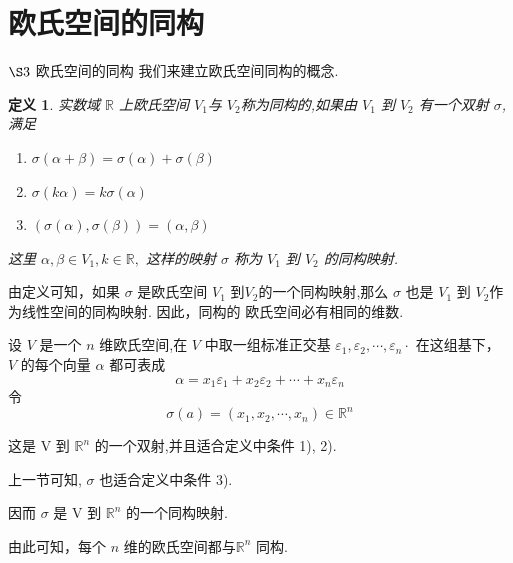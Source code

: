 \documentclass[13pt]{beamer}
\newtheorem*{defi}{定义}
\def\R{\mathbb{R}}
\begin{document}
\section{欧氏空间的同构}
\begin{frame}{$\S 3$ 欧氏空间的同构}
我们来建立欧氏空间同构的概念.  

\begin{defi}
 实数域 $\mathbb{R}$ 上欧氏空间 $V_1$与 $V_2$称为\alert{同构}的,如果由 $V_1$ 到 $V_2$ 有一个双射 $\sigma$,满足
\begin{enumerate}
	\item $\sigma({\alpha}+{\beta})=\sigma({\alpha})+\sigma({\beta})$
	\item $\sigma(k {\alpha})=k \sigma({\alpha})$
	\item $(\sigma({\alpha}), \sigma({\beta}))=({\alpha}, {\beta})$
\end{enumerate}
这里 ${\alpha}, {\beta} \in V_1, k \in {\R},$ 这样的映射 $\sigma$ 称为 $V_1$ 到 $V_2$ 的同构映射. 
\end{defi}
由定义可知，如果 $\sigma$ 是欧氏空间 $V_1$ 到$V_2$的一个同构映射,那么 $\sigma$ 也是 $V_1$ 到 $V_2$作为线性空间的同构映射.
因此，同构的 欧氏空间必有相同的维数.
\end{frame}



\begin{frame}
设 $V$ 是一个 $n$ 维欧氏空间,在 $V$ 中取一组标准正交基 ${\varepsilon}_{1}, {\varepsilon}_{2}, \cdots, {\varepsilon}_{n} \cdot$ 在这组基下， $V$ 的每个向量 ${\alpha}$ 都可表成
\[
{\alpha}= {x}_{1} {\varepsilon}_{1}+x_{2} {{\varepsilon}}_{2}+\cdots+x_{n} {\varepsilon}_{n}
\]
令
\[
\sigma({a})=\left(x_{1}, x_{2}, \cdots, x_{n}\right) \in \mathbb{R}^n
\]

这是 V 到 $\mathbb{R}^n$ 的一个双射,并且适合定义中条件 1), 2).

上一节可知, $\sigma$ 也适合定义中条件 3).

因而 $\sigma$ 是 V 到 $\mathbb{R}^n$ 的一个同构映射.

由此可知，每个 $n$ 维的欧氏空间都与$\mathbb{R}^n$ 同构. 

\end{frame}
\end{document}
